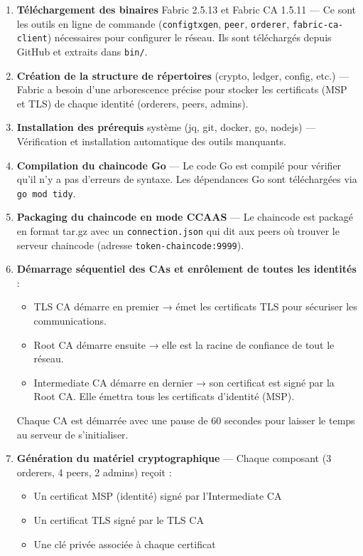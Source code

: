 \documentclass[12pt,a4paper,twoside]{report}
\begin{document}
\begin{enumerate}[leftmargin=2cm]
    \item \textbf{Téléchargement des binaires} Fabric 2.5.13 et Fabric CA 1.5.11 --- Ce sont les outils en ligne de commande (\texttt{configtxgen}, \texttt{peer}, \texttt{orderer}, \texttt{fabric-ca-client}) nécessaires pour configurer le réseau. Ils sont téléchargés depuis GitHub et extraits dans \texttt{bin/}.
    
    \item \textbf{Création de la structure de répertoires} (crypto, ledger, config, etc.) --- Fabric a besoin d'une arborescence précise pour stocker les certificats (MSP et TLS) de chaque identité (orderers, peers, admins).
    
    \item \textbf{Installation des prérequis} système (jq, git, docker, go, nodejs) --- Vérification et installation automatique des outils manquants.
    
    \item \textbf{Compilation du chaincode Go} --- Le code Go est compilé pour vérifier qu'il n'y a pas d'erreurs de syntaxe. Les dépendances Go sont téléchargées via \texttt{go mod tidy}.
    
    \item \textbf{Packaging du chaincode en mode CCAAS} --- Le chaincode est packagé en format tar.gz avec un \texttt{connection.json} qui dit aux peers où trouver le serveur chaincode (adresse \texttt{token-chaincode:9999}).
    
    \item \textbf{Démarrage séquentiel des CAs et enrôlement de toutes les identités} :
    \begin{itemize}
        \item TLS CA démarre en premier → émet les certificats TLS pour sécuriser les communications.
        \item Root CA démarre ensuite → elle est la racine de confiance de tout le réseau.
        \item Intermediate CA démarre en dernier → son certificat est signé par la Root CA. Elle émettra tous les certificats d'identité (MSP).
    \end{itemize}
    Chaque CA est démarrée avec une pause de 60 secondes pour laisser le temps au serveur de s'initialiser.
    
    \item \textbf{Génération du matériel cryptographique} --- Chaque composant (3 orderers, 4 peers, 2 admins) reçoit :
    \begin{itemize}
        \item Un certificat MSP (identité) signé par l'Intermediate CA
        \item Un certificat TLS signé par le TLS CA
        \item Une clé privée associée à chaque certificat
    \end{itemize}
    

\end{enumerate}
\end{document}
